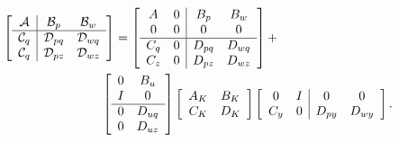 \begin{equation}
\begin{multlined}[][0.9\textwidth]
\left[\begin{array}{c|cc}
\mathcal{A}	&\mathcal{B}_p        &\mathcal{B}_w \\\hline
\mathcal{C}_q	&\mathcal{D}_{pq}   &\mathcal{D}_{wq}\\
\mathcal{C}_q	&\mathcal{D}_{pz}   &\mathcal{D}_{wz}
\end{array}
\right] = 
\left[
\begin{array}{cc|cc}
A   & 0  & B_p    & B_w    \\
0   & 0  & 0      & 0      \\ \hline
C_q & 0  & D_{pq} & D_{wq} \\
C_z & 0  & D_{pz} & D_{wz}
\end{array}
\right] +\\ 
\left[
\begin{array}{cc}
0  & B_u \\
I  & 0\\ \hline
0  & D_{uq}\\
0  & D_{uz}
\end{array}
\right]
\left[
\begin{array}{cc}
A_K  & B_K \\
C_K  & D_K
\end{array}
\right]
\left[
\begin{array}{cc|cc}
0    & I  & 0      & 0        \\
C_y  & 0  & D_{py} & D_{wy}
\end{array}
\right].
\end{multlined}
\label{eq:uncclinc}
\end{equation}

